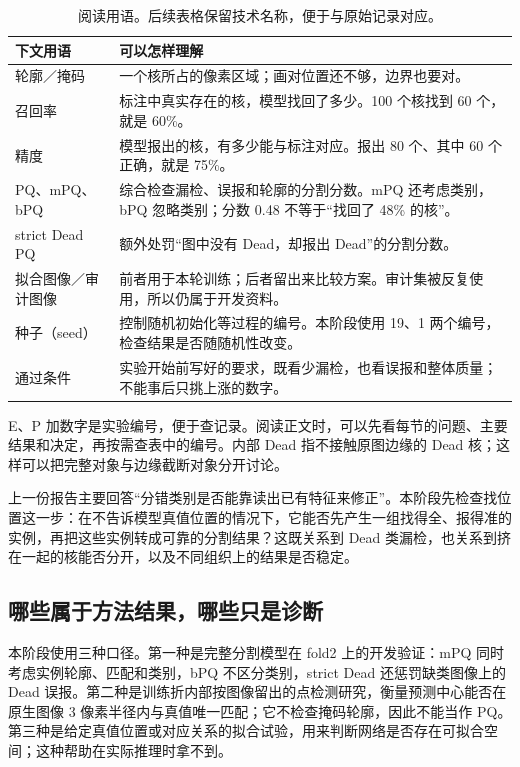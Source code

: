 \documentclass[UTF8,zihao=-4,fontset=windows]{ctexart}
\begin{document}
\begin{table}[H]\centering\small
\begin{tabularx}{\linewidth}{p{29mm}X}\toprule
下文用语 & 可以怎样理解\\\midrule
轮廓／掩码 & 一个核所占的像素区域；画对位置还不够，边界也要对。\\
召回率 & 标注中真实存在的核，模型找回了多少。100 个核找到 60 个，就是 60\%。\\
精度 & 模型报出的核，有多少能与标注对应。报出 80 个、其中 60 个正确，就是 75\%。\\
PQ、mPQ、bPQ & 综合检查漏检、误报和轮廓的分割分数。mPQ 还考虑类别，bPQ 忽略类别；分数 0.48 不等于“找回了 48\% 的核”。\\
strict Dead PQ & 额外处罚“图中没有 Dead，却报出 Dead”的分割分数。\\
拟合图像／审计图像 & 前者用于本轮训练；后者留出来比较方案。审计集被反复使用，所以仍属于开发资料。\\
种子（seed） & 控制随机初始化等过程的编号。本阶段使用 19、1 两个编号，检查结果是否随随机性改变。\\
通过条件 & 实验开始前写好的要求，既看少漏检，也看误报和整体质量；不能事后只挑上涨的数字。\\\bottomrule
\end{tabularx}
\caption{阅读用语。后续表格保留技术名称，便于与原始记录对应。}
\end{table}

E、P 加数字是实验编号，便于查记录。阅读正文时，可以先看每节的问题、主要结果和决定，再按需查表中的编号。内部 Dead 指不接触原图边缘的 Dead 核；这样可以把完整对象与边缘截断对象分开讨论。



上一份报告主要回答“分错类别是否能靠读出已有特征来修正”。本阶段先检查找位置这一步：在不告诉模型真值位置的情况下，它能否先产生一组找得全、报得准的实例，再把这些实例转成可靠的分割结果？这既关系到 Dead 类漏检，也关系到挤在一起的核能否分开，以及不同组织上的结果是否稳定。

\subsection{哪些属于方法结果，哪些只是诊断}

本阶段使用三种口径。第一种是完整分割模型在 fold2 上的开发验证：mPQ 同时考虑实例轮廓、匹配和类别，bPQ 不区分类别，strict Dead 还惩罚缺类图像上的 Dead 误报。第二种是训练折内部按图像留出的点检测研究，衡量预测中心能否在原生图像 3 像素半径内与真值唯一匹配；它不检查掩码轮廓，因此不能当作 PQ。第三种是给定真值位置或对应关系的拟合试验，用来判断网络是否存在可拟合空间；这种帮助在实际推理时拿不到。
\end{document}
